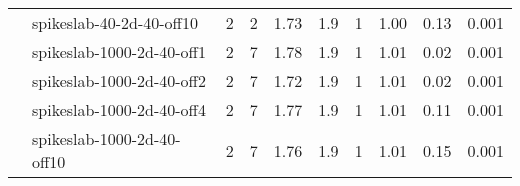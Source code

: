 \begin{tabular}{ll|rrcccccc}
                     & spikeslab-40-2d-40-off10 & 2   & 2    & 1.73 & 1.9 &    1 & 1.00 & 0.13 & 0.001 \\
                     & spikeslab-1000-2d-40-off1 & 2   & 7    & 1.78 & 1.9 &    1 & 1.01 & 0.02 & 0.001 \\
                     & spikeslab-1000-2d-40-off2 & 2   & 7    & 1.72 & 1.9 &    1 & 1.01 & 0.02 & 0.001 \\
                     & spikeslab-1000-2d-40-off4 & 2   & 7    & 1.77 & 1.9 &    1 & 1.01 & 0.11 & 0.001 \\
                     & spikeslab-1000-2d-40-off10 & 2   & 7    & 1.76 & 1.9 &    1 & 1.01 & 0.15 & 0.001 \\
\end{tabular}
